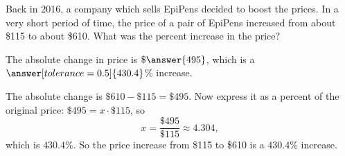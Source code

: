 \documentclass[12pt]{ximera}
\begin{document}
\begin{problem}
Back in 2016, a company which sells EpiPens decided to boost the prices. In a very
short period of time, the price of a pair of EpiPens increased from about \$115 to
about \$610. What was the percent increase in the price?

The absolute change in price is $\$\answer{495}$, which is a
$\answer[tolerance=0.5]{430.4}$\% increase.

\begin{solution}
The absolute change is $\$610 - \$115 = \$495$. Now express it as a percent of the
original price: $\$495 = x \cdot \$115$, so
\[
x = \frac{\$495}{\$115} \approx 4.304,
\]
which is $430.4\%$. So the price increase from \$115 to \$610 is a $430.4\%$ increase.
\end{solution}
\end{problem}
\end{document}
